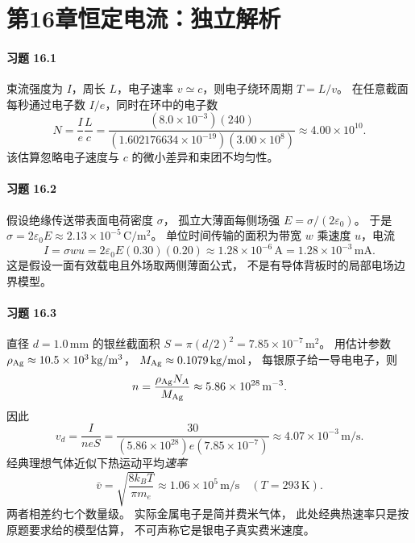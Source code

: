 \section*{第16章\quad 恒定电流：独立解析}

\paragraph{习题 16.1}
束流强度为 \(I\)，周长 \(L\)，电子速率
\(v\simeq c\)，则电子绕环周期
\(T=L/v\)。
在任意截面每秒通过电子数
\(I/e\)，同时在环中的电子数
\[
 \boxed{N=\frac Ie\frac Lc
 =\frac{(8.0\times10^{-3})(240)}
 {(1.602176634\times10^{-19})(3.00\times10^8)}
 \approx4.00\times10^{10}}.
\]
该估算忽略电子速度与 \(c\) 的微小差异和束团不均匀性。

\paragraph{习题 16.2}
假设绝缘传送带表面电荷密度 \(\sigma\)，
孤立大薄面每侧场强
\(E=\sigma/(2\varepsilon_0)\)。
于是
\(\sigma=2\varepsilon_0E
 \approx2.13\times10^{-5}\,\mathrm{C/m^2}\)。
单位时间传输的面积为带宽 \(w\)
乘速度 \(u\)，电流
\[
 \boxed{I=\sigma wu
 =2\varepsilon_0E(0.30)(0.20)
 \approx1.28\times10^{-6}\,\mathrm A
 =1.28\times10^{-3}\,\mathrm{mA}}.
\]
这是假设一面有效载电且外场取两侧薄面公式，
不是有导体背板时的局部电场边界模型。

\paragraph{习题 16.3}
直径 \(d=1.0\,\mathrm{mm}\)
的银丝截面积
\(S=\pi(d/2)^2=7.85\times10^{-7}\,\mathrm{m^2}\)。
用估计参数
\(\rho_{\rm Ag}\approx10.5\times10^3\,\mathrm{kg/m^3}\)，
\(M_{\rm Ag}\approx0.1079\,\mathrm{kg/mol}\)，
每银原子给一导电电子，则
\[
 n=\frac{\rho_{\rm Ag}N_A}{M_{\rm Ag}}
 \approx5.86\times10^{28}\,\mathrm{m^{-3}}.
\]
因此
\[
 \boxed{v_d=\frac{I}{neS}
 =\frac{30}{(5.86\times10^{28})e
 (7.85\times10^{-7})}
 \approx4.07\times10^{-3}\,\mathrm{m/s}}.
\]
经典理想气体近似下热运动平均\emph{速率}
\[
 \boxed{\bar v=\sqrt{\frac{8k_BT}{\pi m_e}}
 \approx1.06\times10^5\,\mathrm{m/s}}\quad(T=293\,\mathrm K).
\]
两者相差约七个数量级。
实际金属电子是简并费米气体，
此处经典热速率只是按原题要求给的模型估算，
不可声称它是银电子真实费米速度。

